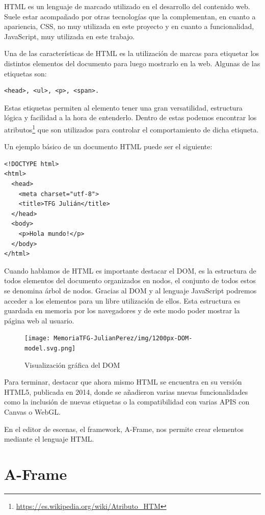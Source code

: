 \documentclass[a4paper, 12pt]{book}
\begin{document}
HTML es un lenguaje de marcado utilizado en el desarrollo del contenido web. Suele estar acompañado por otras tecnologías que la complementan, en cuanto a apariencia, CSS, no muy utilizada en este proyecto y en cuanto a funcionalidad, JavaScript, muy utilizada en este trabajo.

Una de las características de HTML es la utilización de marcas para etiquetar los distintos elementos del documento para luego mostrarlo en la web. Algunas de las etiquetas son: \begin{verbatim}<head>, <ul>, <p>, <span>.\end{verbatim} 

Estas etiquetas permiten al elemento tener una gran versatilidad, estructura lógica y facilidad a la hora de entenderlo. Dentro de estas podemos encontrar los atributos\footnote{\url{https://es.wikipedia.org/wiki/Atributo_HTM}} que son utilizados para controlar el comportamiento de dicha etiqueta.

Un ejemplo básico de un documento HTML puede ser el siguiente:

\begin{verbatim}
<!DOCTYPE html>
<html>
  <head>
    <meta charset="utf-8">
    <title>TFG Julián</title>
  </head>
  <body>
    <p>Hola mundo!</p>
  </body>
</html>
\end{verbatim}

Cuando hablamos de HTML es importante destacar el DOM, es la estructura de todos elementos del documento organizados en nodos, el conjunto de todos estos se denomina árbol de nodos. Gracias al DOM y al lenguaje JavaScript podremos acceder a los elementos para un libre utilización de ellos. Esta estructura es guardada en memoria por los navegadores y de este modo poder mostrar la página web al usuario.


\begin{figure}[H]
  \centering
  \texttt{[image: MemoriaTFG-JulianPerez/img/1200px-DOM-model.svg.png]}
  \caption{Visualización gráfica del DOM}\label{html}
\end{figure}

Para terminar, destacar que ahora mismo HTML se encuentra en su versión HTML5, publicada en 2014, donde se añadieron varias nuevas funcionalidades como la inclusión de nuevas etiquetas o la compatibilidad con varias APIS con Canvas o WebGL.

En el editor de escenas, el framework, A-Frame, nos permite crear elementos mediante el lenguaje HTML.

\section{A-Frame} %
\label{sec:A-Frame}
\end{document}

